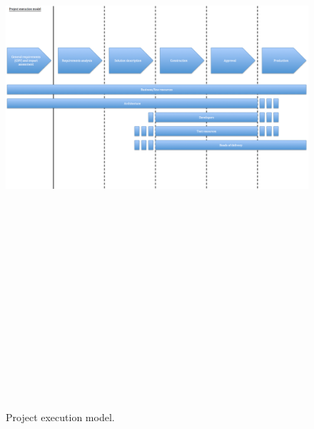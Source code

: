 \begin{figure}[H]
\centering
\includegraphics[angle=90, trim = 0mm 0mm 20mm 0mm,width=160mm, height=230mm]{images/execution_model.png}
\caption{Project execution model.}
\label{project_execution}
\end{figure}

